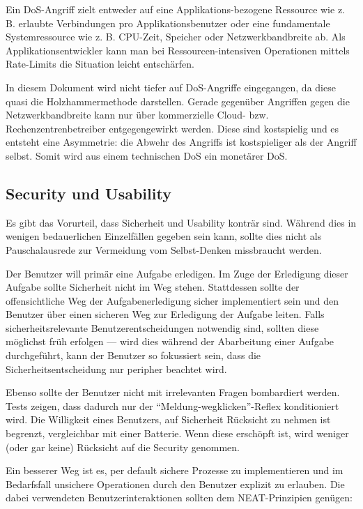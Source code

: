 Ein DoS-Angriff zielt entweder auf eine Applikations-bezogene Ressource wie z. B. erlaubte Verbindungen pro Applikationsbenutzer oder eine fundamentale Systemressource wie z. B. CPU-Zeit, Speicher oder Netzwerkbandbreite ab. Als Applikationsentwickler kann man bei Ressourcen-intensiven Operationen mittels Rate-Limits die Situation leicht entschärfen.

In diesem Dokument wird nicht tiefer auf DoS-Angriffe eingegangen, da diese quasi die Holzhammermethode darstellen. Gerade gegenüber Angriffen gegen die Netzwerkbandbreite kann nur über kommerzielle Cloud- bzw. Rechenzentrenbetreiber entgegengewirkt werden. Diese sind kostspielig und es entsteht eine Asymmetrie: die Abwehr des Angriffs ist kostspieliger als der Angriff selbst. Somit wird aus einem technischen DoS ein monetärer DoS.

\subsection{Security und Usability}

Es gibt das Vorurteil, dass Sicherheit und Usability konträr sind. Während dies in wenigen bedauerlichen Einzelfällen gegeben sein kann, sollte dies nicht als Pauschalausrede zur Vermeidung vom Selbst-Denken missbraucht werden.

Der Benutzer will primär eine Aufgabe erledigen. Im Zuge der Erledigung dieser Aufgabe sollte Sicherheit nicht im Weg stehen. Stattdessen sollte der offensichtliche Weg der Aufgabenerledigung sicher implementiert sein und den Benutzer über einen sicheren Weg zur Erledigung der Aufgabe leiten. Falls sicherheitsrelevante Benutzerentscheidungen notwendig sind, sollten diese möglichst früh erfolgen --- wird dies während der Abarbeitung einer Aufgabe durchgeführt, kann der Benutzer so fokussiert sein, dass die Sicherheitsentscheidung nur peripher beachtet wird.

Ebenso sollte der Benutzer nicht mit irrelevanten Fragen bombardiert werden. Tests zeigen, dass dadurch nur der ``Meldung-wegklicken''-Reflex konditioniert wird. Die Willigkeit eines Benutzers, auf Sicherheit Rücksicht zu nehmen ist begrenzt, vergleichbar mit einer Batterie. Wenn diese erschöpft ist, wird weniger (oder gar keine) Rücksicht auf die Security genommen.

Ein besserer Weg ist es, per default sichere Prozesse zu implementieren und im Bedarfsfall unsichere Operationen durch den Benutzer explizit zu erlauben. Die dabei verwendeten Benutzerinteraktionen sollten dem NEAT-Prinzipien genügen:

